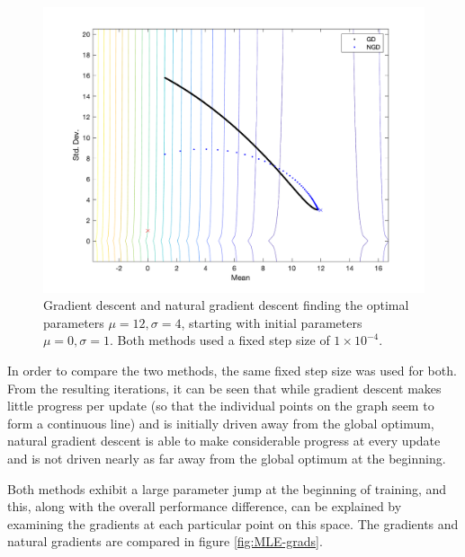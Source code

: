 \documentclass[twoside,10pt]{article}
\begin{document}
\begin{figure}[H]
    \centering
    \includegraphics[scale=0.4]{img/MLE-iterations.png}
    \caption{Gradient descent and natural gradient descent finding the optimal parameters $\mu = 12, \sigma = 4$, starting with initial parameters $\mu = 0, \sigma = 1$. Both methods used a fixed step size of $1 \times 10^{-4}$.}
    \label{fig:MLE}
\end{figure}

In order to compare the two methods, the same fixed step size was used for both. From the resulting iterations, it can be seen that while gradient descent makes little progress per update (so that the individual points on the graph seem to form a continuous line) and is initially driven away from the global optimum, natural gradient descent is able to make considerable progress at every update and is not driven nearly as far away from the global optimum at the beginning.

Both methods exhibit a large parameter jump at the beginning of training, and this, along with the overall performance difference, can be explained by examining the gradients at each particular point on this space. The gradients and natural gradients are compared in figure \ref{fig:MLE-grads}.
\end{document}
